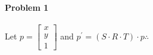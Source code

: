 \documentclass[11pt]{article}
\begin{document}
\MakeScribeTop


\paragraph{\noindent\textbf{\LARGE{Problem 1}}}


\begin{flushleft}
    Let $p = \begin{bmatrix} x\\ y\\ 1 \end{bmatrix} $
   and $p^{'} = (S \cdot R \cdot T) \cdot p \therefore{} $
\end{flushleft}   
\end{document}

